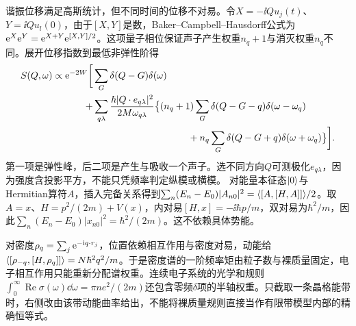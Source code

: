 谐振位移满足高斯统计，但不同时间的位移不对易。令$X=-\ii Q u_j(t)$、$Y=\ii Q u_l(0)$，由于$[X,Y]$是数，Baker--Campbell--Hausdorff公式为$\mathrm e^X\mathrm e^Y=\mathrm e^{X+Y}\mathrm e^{[X,Y]/2}$。这项量子相位保证声子产生权重$n_q+1$与消灭权重$n_q$不同。展开位移指数到最低非弹性阶得
\begin{align}
S(Q,\omega)\propto\e^{-2W}\bigg[&\sum_G\delta(Q-G)\delta(\omega)\\
+&\sum_{q\lambda}\frac{\hbar|Q\cdot e_{q\lambda}|^2}{2M\omega_{q\lambda}}\big\{(n_q+1)\sum_G\delta(Q-G-q)\delta(\omega-\omega_q)\nonumber\\
&\hspace{35mm}+n_q\sum_G\delta(Q-G+q)\delta(\omega+\omega_q)\big\}\bigg].\nonumber
\end{align}
第一项是弹性峰，后二项是产生与吸收一个声子。选不同方向$Q$可测极化$e_{q\lambda}$，因为强度含投影平方，不能只凭频率判定纵模或横模。
对能量本征态$\lvert 0\rangle$与Hermitian算符$A$，插入完备关系得到$\sum_n(E_n-E_0)|A_{n0}|^2=\langle [A,[H,A]]\rangle/2$。取$A=x$、$H=p^2/(2m)+V(x)$，内对易$[H,x]=-\ii\hbar p/m$，双对易为$\hbar^2/m$，因此$\sum_n(E_n-E_0)|x_{n0}|^2=\hbar^2/(2m)$。这不依赖具体势能。

对密度$\rho_q=\sum_j\mathrm e^{-\mathrm i q\cdot r_j}$，位置依赖相互作用与密度对易，动能给$\langle [\rho_{-q},[H,\rho_q]]\rangle=N\hbar^2q^2/m$。于是密度谱的一阶频率矩由粒子数与裸质量固定，电子相互作用只能重新分配谱权重。连续电子系统的光学和规则$\int_0^\infty\operatorname{Re}\sigma(\omega)\dd\omega=\pi ne^2/(2m)$还包含零频$\delta$项的半轴权重。只截取一条晶格能带时，右侧改由该带动能曲率给出，不能将裸质量规则直接当作有限带模型内部的精确恒等式。
